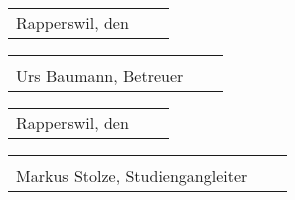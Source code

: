 \vspace{1 cm} 
\begin{tabular}{p{7cm}p{.5cm}l}
Rapperswil, den\dotfill
\end{tabular}%
\hfill 
\begin{tabular}{p{7cm}p{.5cm}l}
\dotfill \\ 
Urs Baumann, Betreuer
\end{tabular}

\vspace{1 cm} 
\begin{tabular}{p{7cm}p{.5cm}l}
Rapperswil, den\dotfill
\end{tabular}%
\hfill 
\begin{tabular}{p{7cm}p{.5cm}l}
\dotfill \\ 
Markus Stolze, Studiengangleiter
\end{tabular}